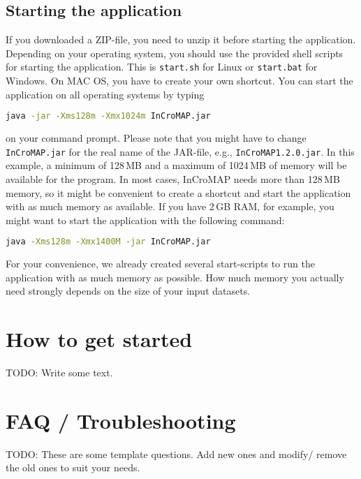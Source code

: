 \section{Starting the application}
\label{startingTheProgram}

If you downloaded a ZIP-file, you need to unzip it before starting the
application. Depending on your operating system, you should use the provided
shell scripts for starting the application. This is \texttt{start.sh} for Linux
or \texttt{start.bat} for Windows. On MAC OS, you have to create your own
shortcut. You can start the application on all operating systems by typing

\begin{lstlisting}[language=bash,numbers=none]
java -jar -Xms128m -Xmx1024m InCroMAP.jar
\end{lstlisting}

\noindent on your command prompt. Please note that you might have to change
\texttt{InCroMAP.jar} for the real name of the JAR-file, e.g.,
\texttt{InCroMAP1.2.0.jar}. In this example, a minimum of 128\,MB and a maximum
of 1024\,MB of memory will be available for the program. In most cases,
InCroMAP needs more than 128\,MB memory, so it might be convenient to create a
shortcut and start the application with as much memory as available. If you
have 2\,GB RAM, for example, you might want to start the application with the
following command:

\begin{lstlisting}[language=bash,numbers=none]
java -Xms128m -Xmx1400M -jar InCroMAP.jar
\end{lstlisting}

For your convenience, we already created several start-scripts to run the
application with as much memory as possible. How much memory you actually need
strongly depends on the size of your input datasets.
%

\chapter{How to get started}

TODO: Write some text.


\chapter{FAQ / Troubleshooting}
\label{ch:faq}

TODO: These are some template questions. Add new ones and modify/ remove the
old ones to suit your needs.

